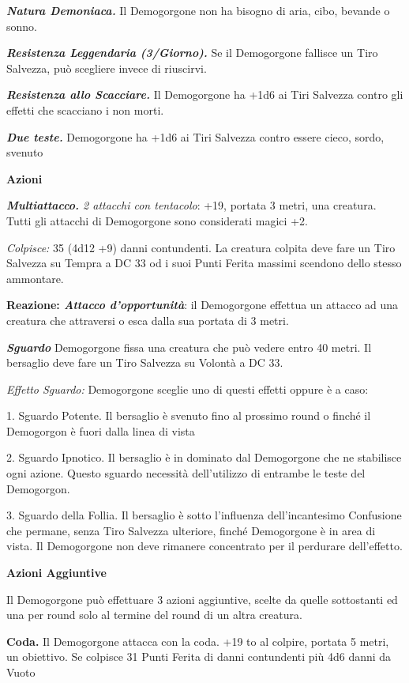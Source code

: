 \begin{multicols}{2}
{\emph{\textbf{Natura Demoniaca.}} Il Demogorgone non ha bisogno di aria, cibo, bevande o sonno.

\emph{\textbf{Resistenza Leggendaria (3/Giorno).}} Se il Demogorgone fallisce un Tiro Salvezza, può scegliere invece di riuscirvi.

\emph{\textbf{Resistenza allo Scacciare.}} Il Demogorgone ha +1d6 ai Tiri Salvezza contro gli effetti che scacciano i non morti.

\emph{\textbf{Due teste.}} Demogorgone ha +1d6 ai Tiri Salvezza contro essere cieco, sordo, svenuto

\textbf{Azioni}

\emph{\textbf{Multiattacco.} 2 attacchi con tentacolo}: +19, portata 3 metri, una creatura. Tutti gli attacchi di Demogorgone sono considerati magici +2.

\emph{Colpisce:} 35 (4d12 +9) danni contundenti. La creatura colpita deve fare un Tiro Salvezza su Tempra a DC 33 od i suoi Punti Ferita massimi scendono dello stesso ammontare.

\textbf{Reazione: \emph{Attacco d'opportunità}}: il Demogorgone effettua un attacco ad una creatura che attraversi o esca dalla sua portata di 3 metri.

\emph{\textbf{Sguardo}} Demogorgone fissa una creatura che può vedere entro 40 metri. Il bersaglio deve fare un Tiro Salvezza su Volontà a DC 33.

\emph{Effetto Sguardo:} Demogorgone sceglie uno di questi effetti oppure è a caso:

1. Sguardo Potente. Il bersaglio è svenuto fino al prossimo round o finché il Demogorgon è fuori dalla linea di vista

2. Sguardo Ipnotico. Il bersaglio è in dominato dal Demogorgone che ne stabilisce ogni azione. Questo sguardo necessità dell'utilizzo di entrambe le teste del Demogorgon.

3. Sguardo della Follia. Il bersaglio è sotto l'influenza dell'incantesimo Confusione che permane, senza Tiro Salvezza ulteriore, finché Demogorgone è in area di vista. Il Demogorgone non deve rimanere concentrato per il perdurare dell'effetto.


\textbf{Azioni Aggiuntive}

Il Demogorgone può effettuare 3 azioni aggiuntive, scelte da quelle sottostanti ed una per round solo al termine del round di un altra creatura.

\textbf{Coda.} Il Demogorgone attacca con la coda. +19 to al colpire, portata 5 metri, un obiettivo. Se colpisce 31 Punti Ferita di danni contundenti più 4d6 danni da Vuoto

}
\end{multicols}
